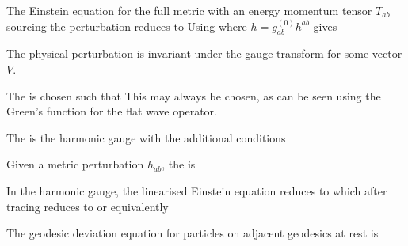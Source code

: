 \documentclass{article}
\begin{document}
\begin{lemma}
The Einstein equation for the full metric with an energy momentum tensor $T_{ab}$ sourcing the perturbation reduces to 
Using 
where $h = g_{ab}^{(0)} h^{ab}$ gives 
\end{lemma}

\begin{lemma}
The physical perturbation is invariant under the gauge transform 
for some vector $V$. 
\end{lemma}

\begin{definition}
The  is chosen such that 
This may always be chosen, as can be seen using the Green's function for the flat wave operator. 
\end{definition}

\begin{definition}
The  is the harmonic gauge with the additional conditions 
\end{definition}

\begin{definition}
Given a metric perturbation $h_{ab}$, the  is 
\end{definition}

\begin{lemma}
In the harmonic gauge, the linearised Einstein equation reduces to 
which after tracing reduces to 
or equivalently 
\end{lemma}

\begin{lemma}
The geodesic deviation equation for particles on adjacent geodesics at rest is 
\end{lemma}
\end{document}
